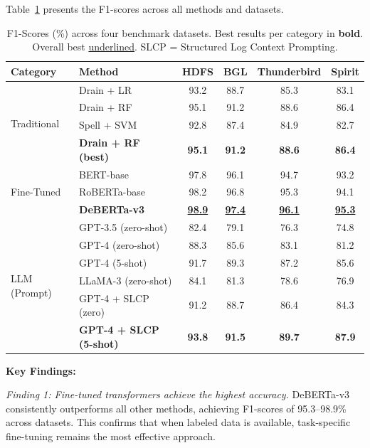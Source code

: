 \documentclass[conference]{IEEEtran}
\begin{document}
Table~\ref{tab:main_results} presents the F1-scores across all methods and datasets.

\begin{table}[t]
\centering
\caption{F1-Scores (\%) across four benchmark datasets. Best results per category in \textbf{bold}. Overall best \underline{underlined}. SLCP = Structured Log Context Prompting.}
\label{tab:main_results}
\begin{tabular}{llcccc}
\toprule
\textbf{Category} & \textbf{Method} & \textbf{HDFS} & \textbf{BGL} & \textbf{Thunderbird} & \textbf{Spirit} \\
\midrule
\multirow{4}{*}{Traditional}
& Drain + LR & 93.2 & 88.7 & 85.3 & 83.1 \\
& Drain + RF & 95.1 & 91.2 & 88.6 & 86.4 \\
& Spell + SVM & 92.8 & 87.4 & 84.9 & 82.7 \\
& \textbf{Drain + RF (best)} & \textbf{95.1} & \textbf{91.2} & \textbf{88.6} & \textbf{86.4} \\
\midrule
\multirow{3}{*}{Fine-Tuned}
& BERT-base & 97.8 & 96.1 & 94.7 & 93.2 \\
& RoBERTa-base & 98.2 & 96.8 & 95.3 & 94.1 \\
& \textbf{DeBERTa-v3} & \textbf{\underline{98.9}} & \textbf{\underline{97.4}} & \textbf{\underline{96.1}} & \textbf{\underline{95.3}} \\
\midrule
\multirow{6}{*}{LLM (Prompt)}
& GPT-3.5 (zero-shot) & 82.4 & 79.1 & 76.3 & 74.8 \\
& GPT-4 (zero-shot) & 88.3 & 85.6 & 83.1 & 81.2 \\
& GPT-4 (5-shot) & 91.7 & 89.3 & 87.2 & 85.6 \\
& LLaMA-3 (zero-shot) & 84.1 & 81.3 & 78.6 & 76.9 \\
& GPT-4 + SLCP (zero) & 91.2 & 88.7 & 86.4 & 84.3 \\
& \textbf{GPT-4 + SLCP (5-shot)} & \textbf{93.8} & \textbf{91.5} & \textbf{89.7} & \textbf{87.9} \\
\bottomrule
\end{tabular}
\end{table}

\textbf{Key Findings:}

\textit{Finding 1: Fine-tuned transformers achieve the highest accuracy.} DeBERTa-v3 consistently outperforms all other methods, achieving F1-scores of 95.3--98.9\% across datasets. This confirms that when labeled data is available, task-specific fine-tuning remains the most effective approach.
\end{document}
